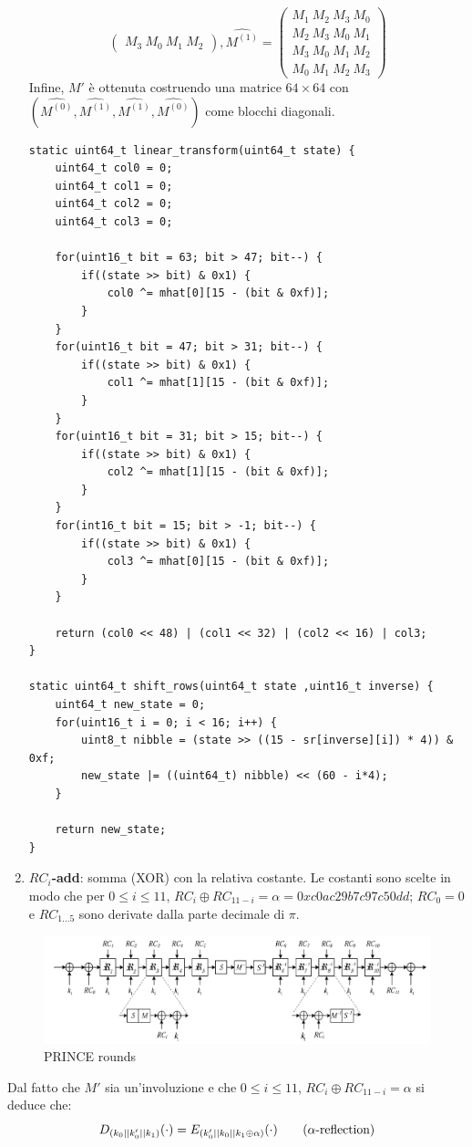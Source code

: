 \documentclass[target=bach,aauheader=,style=]{thud}
\begin{document}
\begin{enumerate}
\[\begin{pmatrix}
					M_3\ M_0\ M_1\ M_2
				\end{pmatrix},
				\hat{M^{(1)}} = 
				\begin{pmatrix}
					M_1\ M_2\ M_3\ M_0\\
					M_2\ M_3\ M_0\ M_1\\
					M_3\ M_0\ M_1\ M_2\\
					M_0\ M_1\ M_2\ M_3
				\end{pmatrix}
				\]
				Infine, $M'$ è ottenuta costruendo una matrice $64 \times 64$ con $(\hat{M^{(0)}} , \hat{M^{(1)}}, \hat{M^{(1)}}, \hat{M^{(0)}})$ come blocchi diagonali.
\begin{lstlisting}[style=CStyle]
static uint64_t linear_transform(uint64_t state) {
	uint64_t col0 = 0;
	uint64_t col1 = 0;
	uint64_t col2 = 0;
	uint64_t col3 = 0;
	
	for(uint16_t bit = 63; bit > 47; bit--) {
		if((state >> bit) & 0x1) {
			col0 ^= mhat[0][15 - (bit & 0xf)];
		}
	}
	for(uint16_t bit = 47; bit > 31; bit--) {
		if((state >> bit) & 0x1) {
			col1 ^= mhat[1][15 - (bit & 0xf)];
		}
	}
	for(uint16_t bit = 31; bit > 15; bit--) {
		if((state >> bit) & 0x1) {
			col2 ^= mhat[1][15 - (bit & 0xf)];
		}
	}
	for(int16_t bit = 15; bit > -1; bit--) {
		if((state >> bit) & 0x1) {
			col3 ^= mhat[0][15 - (bit & 0xf)];
		}
	}
	
	return (col0 << 48) | (col1 << 32) | (col2 << 16) | col3;
}

static uint64_t shift_rows(uint64_t state ,uint16_t inverse) {
	uint64_t new_state = 0;
	for(uint16_t i = 0; i < 16; i++) {	
		uint8_t nibble = (state >> ((15 - sr[inverse][i]) * 4)) & 0xf;
		new_state |= ((uint64_t) nibble) << (60 - i*4);
	}
	
	return new_state;
}\end{lstlisting}
				\item \textbf{$RC_i$-add}: somma (XOR) con la relativa costante. Le costanti sono scelte in modo che per $0 \le i \le 11$, $RC_i \oplus RC_{11-i} = \alpha = 0xc0ac29b7c97c50dd$; $RC_0 = 0$ e $RC_{1...5}$ sono derivate dalla parte decimale di $\pi$.
			\end{enumerate}
				\begin{figure}[htbp]
				\centering
				\includegraphics[width=0.5\linewidth]{img/princestruct.jpg}
				\caption{PRINCE rounds}
				\label{fig:placeholder}
			\end{figure}
			Dal fatto che $M'$ sia un'involuzione e che $0 \le i \le 11$, $RC_i \oplus RC_{11-i} = \alpha$ si deduce che:
			\[D_{(k_0||k'_0||k_1)}(\cdot) = E_{(k'_0||k_0||k_1 \oplus \alpha)}(\cdot) \tag{\text{$\alpha$-reflection}}\]
			
\end{document}
